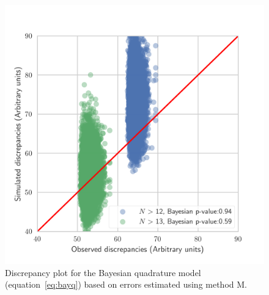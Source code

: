\documentclass[a4paper,fleqn,usenatbib]{mnras}
\begin{document}
\begin{figure}
	\includegraphics[scale=0.7]{discq2.png}
    \caption{Discrepancy plot for the Bayesian quadrature model (equation~\ref{eq:bayq}) based on errors estimated using method M. }
    \label{fig:discq2}
\end{figure}
\end{document}
